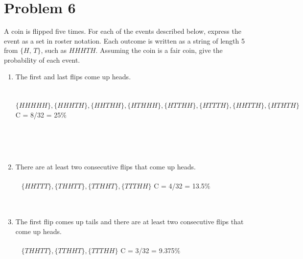 \documentclass{amsart}
\theoremstyle{definition}
\theoremstyle{Exercise}
\theoremstyle{remark}
\theoremstyle{rule}
\numberwithin{equation}{section}
\begin{document}
\section*{Problem 6}
A coin is flipped five times. For each of the events described below, express the event as a set in roster notation. Each outcome is written as a string of length 5 from $\{H,\, T\}$, such as $HHHTH$. Assuming the coin is a fair coin, give the probability of each event.\\


\begin{enumerate}[label=(\alph*)]
\item The first and last flips come up heads.\\\\\
$\{HHHHH\}, \{HHHTH\}, \{HHTHH\}, \{HTHHH\}, \{HTTHH\}, \{HTTTH\}, \{HHTTH\}, \{HTHTH\}$ 
C = 8/32 = 25\%

\\\\\
\item There are at least two consecutive flips that come up heads.\\\\\
$\{HHTTT\}, \{THHTT\}, \{TTHHT\}, \{TTTHH\}$ 
C = 4/32 = 13.5\%
\\\\\
\item The first flip comes up tails and there are at least two consecutive flips that come up heads.\\\\\
$\{THHTT\}, \{TTHHT\}, \{TTTHH\}$ 
C = 3/32 = 9.375\%
\\\\\
\end{enumerate}

 \newpage
\end{document}
